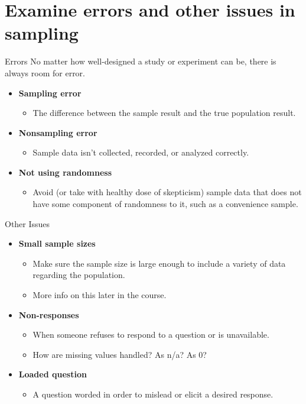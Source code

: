 \documentclass[t]{beamer}
\begin{document}
\section{Examine errors and other issues in sampling}

\begin{frame}{Errors}
No matter how well-designed a study or experiment can be, there is always room for error.
\begin{itemize}
	\item<+-> \textbf{Sampling error}
	\begin{itemize}
		\item<+-> The difference between the sample result and the true population result.
	\end{itemize}
	\item<+-> \textbf{Nonsampling error}
	\begin{itemize}
		\item<+-> Sample data isn't collected, recorded, or analyzed correctly.
	\end{itemize}
	\item<+-> \textbf{Not using randomness}
	\begin{itemize}
		\item<+-> Avoid (or take with healthy dose of skepticism) sample data that does not have some component of randomness to it, such as a convenience sample.
	\end{itemize}
\end{itemize}
\end{frame}

\begin{frame}{Other Issues}
\begin{itemize}
	\item<+-> \textbf{Small sample sizes}
	\begin{itemize}
		\item<+-> Make sure the sample size is large enough to include a variety of data regarding the population.
		\item<+-> More info on this later in the course.
	\end{itemize}
	\item<+-> \textbf{Non-responses}
	\begin{itemize}
		\item<+-> When someone refuses to respond to a question or is unavailable.
		\item<+-> How are missing values handled? As n/a? As 0?
	\end{itemize}
	\item<+-> \textbf{Loaded question}
	\begin{itemize}
		\item<+-> A question worded in order to mislead or elicit a desired response.
	\end{itemize}
\end{itemize}
\end{frame}
\end{document}
